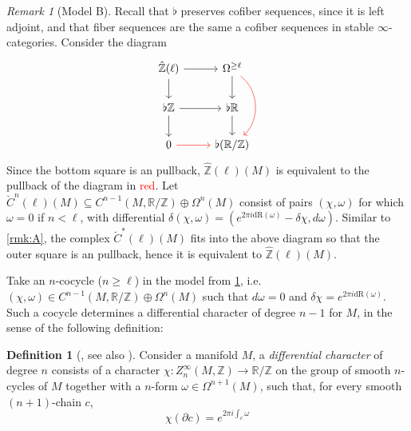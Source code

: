 \documentclass[10pt]{amsart}
\newcommand{\bR}{\mathbb{R}}
\newcommand{\bZ}{\mathbb{Z}}
\newcommand{\dr}{\mathrm{dR}}
\theoremstyle{definition}
\newtheorem{definition}[equation]{Definition}
\theoremstyle{remark}
\newtheorem{remark}[equation]{Remark}
\numberwithin{equation}{section}
\begin{document}
\begin{remark}[Model B]\label{rmk:B} Recall that $\flat$ preserves cofiber sequences, since it is left adjoint, and that fiber sequences are the same a cofiber sequences in stable $\infty$-categories. Consider the diagram
  \[\begin{tikzcd}
    \hat{\bZ}(\ell)\arrow[r]\arrow[d] & \Omega^{\geq \ell}\arrow[d]\arrow[dd,bend left=5em,color=red] \\
    \flat\bZ \arrow[r]\arrow[d] & \flat\bR\arrow[d] \\
    0\arrow[r,color=red] & \flat(\bR/\bZ)
  \end{tikzcd}\]
  Since the bottom square is an pullback, $\hat{\bZ}(\ell)(M)$ is equivalent to the pullback of the diagram in \textcolor{red}{red}. Let $\breve{C}^{n}(\ell)(M)\subseteq C^{n-1}(M,\bR/\bZ)\oplus\Omega^n(M)$ consist of pairs $(\chi,\omega)$ for which $\omega=0$ if $n<\ell$, with differential $\delta(\chi,\omega)=(e^{2\pi i\dr(\omega)}-\delta\chi,d\omega)$. Similar to \cref{rmk:A}, the complex $\breve{C}^*(\ell)(M)$ fits into the above diagram so that the outer square is an pullback, hence it is equivalent to $\hat{\bZ}(\ell)(M)$.
\end{remark}
Take an $n$-cocycle ($n\geq\ell$) in the model from \cref{rmk:B}, i.e. $(\chi,\omega)\in C^{n-1}(M,\bR/\bZ)\oplus\Omega^{n}(M)$ such that $d\omega=0$ and $\delta\chi=e^{2\pi i\dr(\omega)}$. Such a cocycle determines a differential character of degree $n-1$ for $M$, in the sense of the following definition:
\begin{definition}[{\cite[Definition 3.4]{hopkinssinger2005diffcoh}}, see also {\cite[Chapter 5]{barbecker2014diffchar}}] Consider a manifold $M$, a \emph{differential character} of degree $n$ consists of a character $\chi:Z^\infty_{n}(M,\bZ)\to\bR/\bZ$ on the group of smooth $n$-cycles of $M$ together with a $n$-form $\omega\in\Omega^{n+1}(M)$, such that, for every smooth $(n+1)$-chain $c$, \[\chi(\partial c)=e^{2\pi i\int_c\omega}\]
\end{definition}
\end{document}

